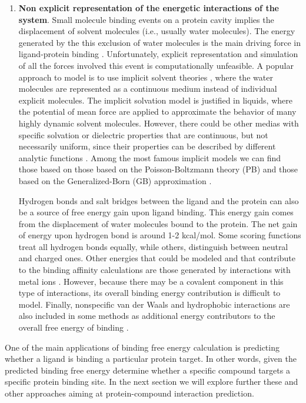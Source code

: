 \documentclass[12pt, b5paper,twoside]{tesi_upf}
\begin{document}
\begin{enumerate}
\item \textbf{Non explicit representation of the energetic interactions of the system}. Small molecule binding events on a protein cavity implies the displacement of solvent molecules (i.e., usually water molecules). The energy generated by the this exclusion of water molecules is the main driving force in ligand-protein binding \cite{Michel2009a}. Unfortunately, explicit representation and simulation of all the forces involved this event is computationally unfeasible. A popular approach to model is to use implicit solvent theories \cite{Ravindranathan2011, Michel2006, Liu2009}, where the water molecules are represented as a continuous medium instead of individual explicit molecules. The implicit solvation model is justified in liquids, where the potential of mean force are applied to approximate the behavior of many highly dynamic solvent molecules. However, there could be other medias with specific solvation or dielectric properties that are continuous, but not necessarily uniform, since their properties can be described by different analytic functions \cite{Lu2007}. Among the most famous implicit models we can find those based on those based on the Poisson-Boltzmann theory (PB) \cite{Sharp1990} and those based on the Generalized-Born (GB) approximation \cite{Bashford2000}. 
\par Hydrogen bonds and salt bridges between the ligand and the protein can also be a source of free energy gain upon ligand binding. This energy gain comes from the displacement of water molecules bound to the protein. The net gain of energy upon hydrogen bond is around 1-2 kcal/mol. Some scoring functions treat all hydrogen bonds equally, while others, distinguish between neutral and charged ones. Other energies that could be modeled and that contribute to the binding affinity calculations are those generated by interactions with metal ions \cite{Friesner2004}. However, because there may be a covalent component in this type of interactions, its overall binding energy contribution is difficult to model. Finally, nonspecific van der Waals and hydrophobic interactions are also included in some methods as additional energy contributors to the overall free energy of binding \cite{Steffen2010}. 
\end{enumerate}

\par One of the main applications of binding free energy calculation is predicting whether a ligand is binding a particular protein target. In other words, given the predicted binding free energy determine whether a specific compound targets a specific protein binding site. In the next section we will explore further these and other approaches aiming at protein-compound interaction prediction.  
\end{document}
